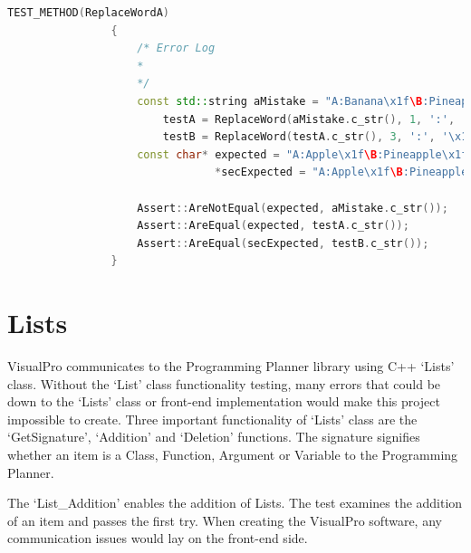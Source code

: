 \documentclass[12pt]{report} %
\begin{document}
			
			\begin{lstlisting}[language=c++]
				TEST_METHOD(ReplaceWordA)
				{
					/* Error Log
					* 
					*/
					const std::string aMistake = "A:Banana\x1f\B:Pineapple\x1f\C:Grapefruit",
						testA = ReplaceWord(aMistake.c_str(), 1, ':', '\x1f', "Apple"),
						testB = ReplaceWord(testA.c_str(), 3, ':', '\x1f', "Banana");
					const char* expected = "A:Apple\x1f\B:Pineapple\x1f\C:Grapefruit",
								*secExpected = "A:Apple\x1f\B:Pineapple\x1f\C:Banana";

					Assert::AreNotEqual(expected, aMistake.c_str());
					Assert::AreEqual(expected, testA.c_str());
					Assert::AreEqual(secExpected, testB.c_str());
				}
			\end{lstlisting}
		\section{Lists}
			VisualPro communicates to the Programming Planner library using C++ `Lists' class. Without the `List' class functionality testing, many errors that could be down to the `Lists' class or front-end implementation would make this project impossible to create. Three important functionality of `Lists' class are the `GetSignature', `Addition' and `Deletion' functions. The signature signifies whether an item is a Class, Function, Argument or Variable to the Programming Planner.
            
            The `List\_Addition' enables the addition of Lists. The test examines the addition of an item and passes the first try. When creating the VisualPro software, any communication issues would lay on the front-end side.
\end{document}
